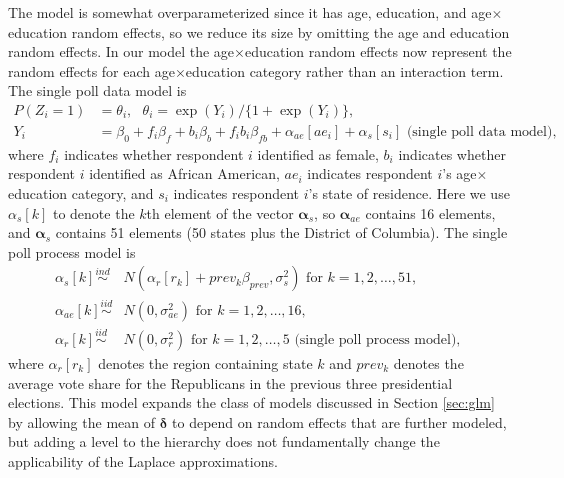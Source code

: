\documentclass[12pt]{article}
\begin{document}
The model is somewhat overparameterized since it has age, education, and age$\times$education random effects, so we reduce its size by omitting the age and education random effects. In our model the age$\times$education random effects now represent the random effects for each age$\times$education category rather than an interaction term. The single poll data model is
\begin{align*}
P(Z_i = 1) &= \theta_i,\ \ \   \theta_i = \exp(Y_i)/\{1 + \exp(Y_i)\}, \\
Y_i &= \beta_0 + f_i\beta_f + b_i\beta_b + f_ib_i\beta_{fb} + \alpha_{ae}[ae_i] + \alpha_{s}[s_i]\mbox{\ \ \ \ (single poll data model), }
\end{align*}
where $f_i$ indicates whether respondent $i$ identified as female, $b_i$ indicates whether respondent $i$ identified as African American, $ae_i$ indicates respondent $i$'s age$\times$education category, and $s_i$ indicates respondent $i$'s state of residence. Here we use $\alpha_{s}[k]$ to denote the $k$th element of the vector $\bm{\alpha}_s$, so $\bm{\alpha}_{ae}$ contains 16 elements, and $\bm{\alpha}_s$ contains 51 elements (50 states plus the District of Columbia). The single poll process model is
\begin{align*}
\alpha_s[k] \stackrel{ind}{\sim}& N(\alpha_r[r_k] + prev_k\beta_{prev}, \sigma^2_s) \mbox{ for } k=1,2,\dots,51,\\
\alpha_{ae}[k] \stackrel{iid}{\sim}& N(0, \sigma^2_{ae}) \mbox{ for } k=1,2,\dots,16,\\
\alpha_{r}[k] \stackrel{iid}{\sim}& N(0, \sigma^2_{r}) \mbox{ for } k=1,2,\dots,5 \mbox{\ \ \ \ (single poll process model), }
\end{align*}
where $\alpha_r[r_k]$ denotes the region containing state $k$ and $prev_k$ denotes the average vote share for the Republicans in the previous three presidential elections. This model expands the class of models discussed in Section \ref{sec:glm} by allowing the mean of $\bm{\delta}$ to depend on random effects that are further modeled, but adding a level to the hierarchy does not fundamentally change the applicability of the Laplace approximations.
\end{document}
